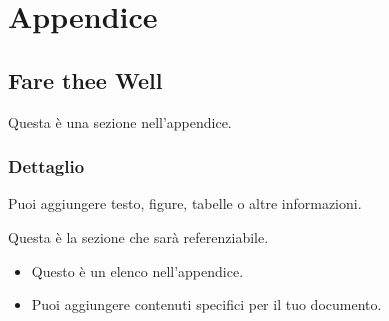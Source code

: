 \appendix %
\chapter{Appendice}

\section{Fare thee Well}
\label{sec:farethewell} 
Questa è una sezione nell'appendice.

\subsection{Dettaglio}
Puoi aggiungere testo, figure, tabelle o altre informazioni.

\label{sec:appendice} %
Questa è la sezione che sarà referenziabile.

\begin{itemize}
    \item Questo è un elenco nell'appendice.
    \item Puoi aggiungere contenuti specifici per il tuo documento.
\end{itemize}
